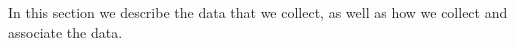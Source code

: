 

In this section we describe the data that we collect, as well as how we collect and associate the data.

